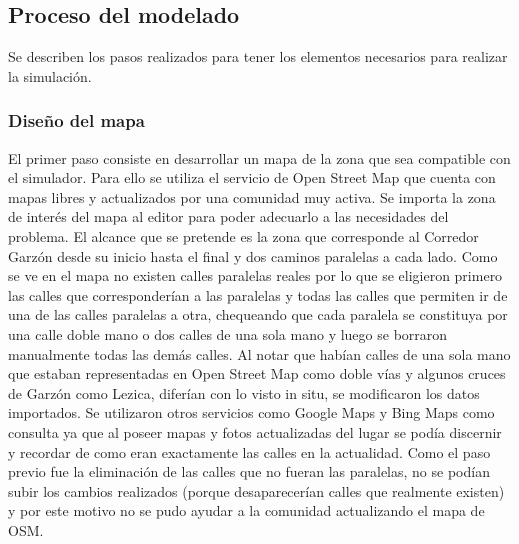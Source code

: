 \subsection{Proceso del modelado}

Se describen los pasos realizados para tener los elementos necesarios para realizar la simulación.

\subsubsection{Diseño del mapa}

El primer paso consiste en desarrollar un mapa de la zona que sea compatible con el simulador. Para ello se utiliza el servicio de Open Street Map \citep{OSM} que cuenta con mapas libres y actualizados por una comunidad muy activa. Se importa la zona de interés del mapa al editor \citet{JOSM} para poder adecuarlo a las necesidades del problema. El alcance que se pretende es la zona que corresponde al Corredor Garzón desde su inicio hasta el final y dos caminos paralelas a cada lado.
Como se ve en el mapa no existen calles paralelas reales por lo que se eligieron primero las calles que corresponderían a las paralelas y todas las calles que permiten ir de una de las calles paralelas a otra, chequeando que cada paralela se constituya por una calle doble mano o dos calles de una sola mano y luego se borraron manualmente todas las demás calles.
Al notar que habían calles de una sola mano que estaban representadas en Open Street Map como doble vías y algunos cruces de Garzón como Lezica, diferían con lo visto in situ, se modificaron los datos importados. Se utilizaron otros servicios como Google Maps y Bing Maps como consulta ya que al poseer mapas y fotos actualizadas del lugar se podía discernir y recordar de como eran exactamente las calles en la actualidad. Como el paso previo fue la eliminación de las calles que no fueran las paralelas, no se podían subir los cambios realizados (porque desaparecerían calles que realmente existen) y por este motivo no se pudo ayudar a la comunidad actualizando el mapa de OSM.

